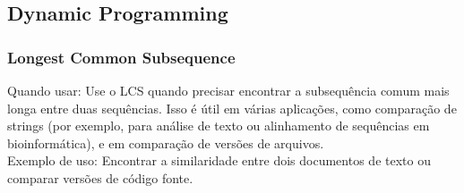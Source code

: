 \documentclass{article}
\begin{document}
\subsection{Dynamic Programming}

\subsubsection{Longest Common Subsequence}

Quando usar: Use o LCS quando precisar encontrar a subsequência comum mais longa entre duas sequências. Isso é útil em várias aplicações, como comparação de strings (por exemplo, para análise de texto ou alinhamento de sequências em bioinformática), e em comparação de versões de arquivos.
\\Exemplo de uso: Encontrar a similaridade entre dois documentos de texto ou comparar versões de código fonte.
\end{document}
